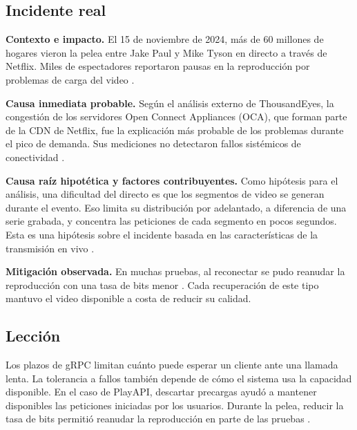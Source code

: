 \subsection{Incidente real}
\textbf{Contexto e impacto.} El 15 de noviembre de 2024, más de 60 millones de hogares vieron la pelea entre Jake Paul y Mike Tyson en directo a través de Netflix. Miles de espectadores reportaron pausas en la reproducción por problemas de carga del video \cite{fallos-temple}.

\textbf{Causa inmediata probable.} Según el análisis externo de ThousandEyes, la congestión de los servidores Open Connect Appliances (OCA), que forman parte de la CDN de Netflix, fue la explicación más probable de los problemas durante el pico de demanda. Sus mediciones no detectaron fallos sistémicos de conectividad \cite{fallos-thousandeyes}.

\textbf{Causa raíz hipotética y factores contribuyentes.} Como hipótesis para el análisis, una dificultad del directo es que los segmentos de video se generan durante el evento. Eso limita su distribución por adelantado, a diferencia de una serie grabada, y concentra las peticiones de cada segmento en pocos segundos. Esta es una hipótesis sobre el incidente basada en las características de la transmisión en vivo \cite{fallos-temple,fallos-thousandeyes}.

\textbf{Mitigación observada.} En muchas pruebas, al reconectar se pudo reanudar la reproducción con una tasa de bits menor \cite{fallos-thousandeyes}. Cada recuperación de este tipo mantuvo el video disponible a costa de reducir su calidad.

\subsection{Lección}
Los plazos de gRPC limitan cuánto puede esperar un cliente ante una llamada lenta. La tolerancia a fallos también depende de cómo el sistema usa la capacidad disponible. En el caso de PlayAPI, descartar precargas ayudó a mantener disponibles las peticiones iniciadas por los usuarios. Durante la pelea, reducir la tasa de bits permitió reanudar la reproducción en parte de las pruebas \cite{fallos-grpc,fallos-netflix,fallos-thousandeyes}.


